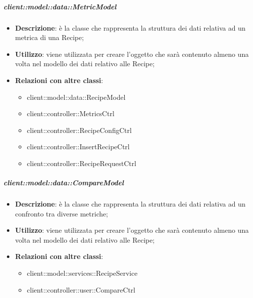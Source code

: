 		\subparagraph{client::model::data::MetricModel} %
		\label{subp:client_model_data_metricmodel}
			\begin{itemize}
				\item \textbf{Descrizione}: è la classe che rappresenta la struttura dei dati relativa ad un metrica di una Recipe;
				\item \textbf{Utilizzo}: viene utilizzata per creare l'oggetto che sarà contenuto almeno una volta nel modello dei dati relativo alle Recipe;
				\item \textbf{Relazioni con altre classi}:
					\begin{itemize}
						\item client::model::data::RecipeModel
						\item client::controller::MetricsCtrl
						\item client::controller::RecipeConfigCtrl
						\item client::controller::InsertRecipeCtrl
						\item client::controller::RecipeRequestCtrl
					\end{itemize}
			\end{itemize}

		\subparagraph{client::model::data::CompareModel} %
		\label{subp:client_model_data_comparemodel}
			\begin{itemize}
				\item \textbf{Descrizione}: è la classe che rappresenta la struttura dei dati relativa ad un confronto tra diverse metriche;
				\item \textbf{Utilizzo}: viene utilizzata per creare l'oggetto che sarà contenuto almeno una volta nel modello dei dati relativo alle Recipe;
				\item \textbf{Relazioni con altre classi}:
					\begin{itemize}
						\item client::model::services::RecipeService
						\item client::controller::user::CompareCtrl
					\end{itemize}
			\end{itemize}

